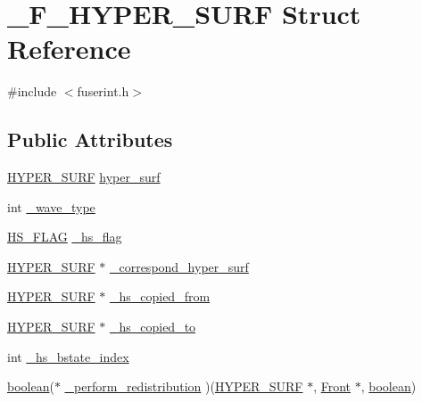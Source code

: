 \hypertarget{struct___f___h_y_p_e_r___s_u_r_f}{}\section{\+\_\+\+F\+\_\+\+H\+Y\+P\+E\+R\+\_\+\+S\+U\+RF Struct Reference}
\label{struct___f___h_y_p_e_r___s_u_r_f}


{\ttfamily \#include $<$fuserint.\+h$>$}

\subsection*{Public Attributes}
\begin{DoxyCompactItemize}
\item 
\hyperlink{int_8h_acef50fa4757ce0d3f75c97fab5a175bc}{H\+Y\+P\+E\+R\+\_\+\+S\+U\+RF} \hyperlink{struct___f___h_y_p_e_r___s_u_r_f_af1559137a18a22a81ecedf9fa2b8edcd}{hyper\+\_\+surf}
\item 
int \hyperlink{struct___f___h_y_p_e_r___s_u_r_f_a455d050550c40e694ae3f5f81309c2dd}{\+\_\+wave\+\_\+type}
\item 
\hyperlink{fuserint_8h_acc59ae6b5788847f35899ffe852c3b39}{H\+S\+\_\+\+F\+L\+AG} \hyperlink{struct___f___h_y_p_e_r___s_u_r_f_a46030c1de88943108dde33dbf6554e88}{\+\_\+hs\+\_\+flag}
\item 
\hyperlink{int_8h_acef50fa4757ce0d3f75c97fab5a175bc}{H\+Y\+P\+E\+R\+\_\+\+S\+U\+RF} $\ast$ \hyperlink{struct___f___h_y_p_e_r___s_u_r_f_abbb50c0b82dfc65741a00dd17a7adfdf}{\+\_\+correspond\+\_\+hyper\+\_\+surf}
\item 
\hyperlink{int_8h_acef50fa4757ce0d3f75c97fab5a175bc}{H\+Y\+P\+E\+R\+\_\+\+S\+U\+RF} $\ast$ \hyperlink{struct___f___h_y_p_e_r___s_u_r_f_a8e48607002ee83ba389ecd76b6daa0a4}{\+\_\+hs\+\_\+copied\+\_\+from}
\item 
\hyperlink{int_8h_acef50fa4757ce0d3f75c97fab5a175bc}{H\+Y\+P\+E\+R\+\_\+\+S\+U\+RF} $\ast$ \hyperlink{struct___f___h_y_p_e_r___s_u_r_f_a8c6de354b68a1c2e995ab2263813c95a}{\+\_\+hs\+\_\+copied\+\_\+to}
\item 
int \hyperlink{struct___f___h_y_p_e_r___s_u_r_f_afd9fadbdb5563d4e3bb36caa02db6e22}{\+\_\+hs\+\_\+bstate\+\_\+index}
\item 
\hyperlink{cdecs_8h_ad048433382a936258fb49e2ec4f148e1}{boolean}($\ast$ \hyperlink{struct___f___h_y_p_e_r___s_u_r_f_afc5d5386a2ceef1da4f182572b808d88}{\+\_\+perform\+\_\+redistribution} )(\hyperlink{int_8h_acef50fa4757ce0d3f75c97fab5a175bc}{H\+Y\+P\+E\+R\+\_\+\+S\+U\+RF} $\ast$, \hyperlink{fdecs_8h_ac32202b798f848095c489cfd04c4ca5f}{Front} $\ast$, \hyperlink{cdecs_8h_ad048433382a936258fb49e2ec4f148e1}{boolean})

\end{DoxyCompactItemize}
